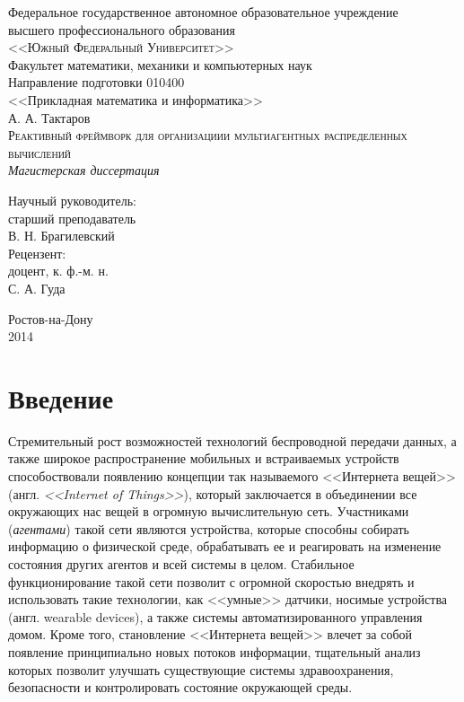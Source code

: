 \documentclass[a4paper,14pt,href]{article}
\begin{document}
\thispagestyle{empty}
\begin{center}
Федеральное государственное автономное образовательное учреждение \\
высшего профессионального образования \\
\textsc{<<Южный Федеральный Университет>>}\\[1.0cm]

Факультет математики, механики и компьютерных наук\\[1.0cm]

Направление подготовки 010400 \\
<<Прикладная математика и информатика>>\\[3cm]

А. А. Тактаров \\[1.0cm]
\textsc{Реактивный фреймворк для организациии мультиагентных распределенных вычислений}\\[1.0cm]

\textit{Магистерская диссертация}\\[2.0cm]

\begin{flushright}
    Научный руководитель: \\
    старший преподаватель \\
    В. Н. Брагилевский \\[1.0cm]

    Рецензент: \\
    доцент, к. ф.-м. н.\\
    С. А. Гуда
\end{flushright}

\vfill

  Ростов-на-Дону\\
  2014
\end{center}

\newpage
\tableofcontents

\newpage
\section*{Введение}

Стремительный рост возможностей технологий беспроводной передачи данных, а также широкое распространение мобильных и встраиваемых устройств
способоствовали появлению концепции так называемого <<Интернета вещей>> (англ. \textit{<<Internet of Things>>})\cite{IoTWired}, который заключается в объединении все окружающих нас вещей в огромную вычислительную сеть. Участниками (\textit{агентами}) такой сети являются устройства, которые способны собирать информацию о физической среде, обрабатывать ее и реагировать на изменение состояния других агентов и всей системы в целом. Стабильное функционирование такой сети позволит с огромной скоростью внедрять и использовать такие технологии, как <<умные>> датчики\cite{NestThermostat}, носимые устройства (англ. wearable devices), а также системы автоматизированного управления домом. Кроме того, становление <<Интернета вещей>> влечет за собой появление принципиально новых потоков информации, тщательный анализ которых позволит улучшать существующие системы здравоохранения, безопасности и контролировать состояние окружающей среды.
\end{document}
